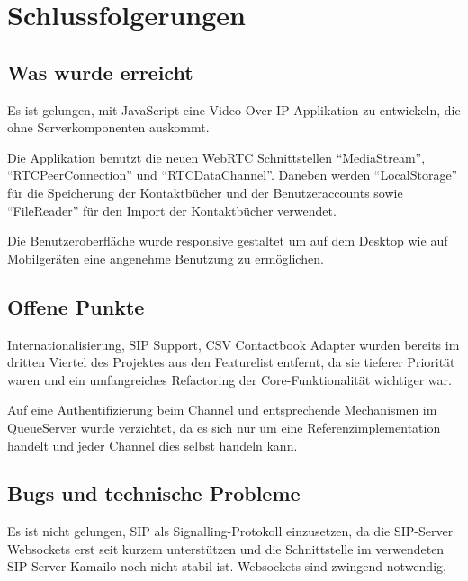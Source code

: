 \chapter{Schlussfolgerungen}
	\section{Was wurde erreicht}
	Es ist gelungen, mit JavaScript eine Video-Over-IP Applikation zu entwickeln, die ohne Serverkomponenten auskommt.
	
	Die Applikation benutzt die neuen WebRTC Schnittstellen ``MediaStream'', ``RTCPeerConnection'' und ``RTCDataChannel''. Daneben werden ``LocalStorage'' für die Speicherung der Kontaktbücher und der Benutzeraccounts sowie ``FileReader'' für den Import der Kontaktbücher verwendet.
	
	Die Benutzeroberfläche wurde responsive gestaltet um auf dem Desktop wie auf Mobilgeräten eine angenehme Benutzung zu ermöglichen.
	
	
	\section{Offene Punkte}
	Internationalisierung, SIP Support, CSV Contactbook Adapter wurden bereits im dritten Viertel des Projektes aus den Featurelist entfernt, da sie tieferer Priorität waren und ein umfangreiches Refactoring der Core-Funktionalität wichtiger war.
	
	Auf eine Authentifizierung beim Channel und entsprechende Mechanismen im QueueServer wurde verzichtet, da es sich nur um eine Referenzimplementation handelt und jeder Channel dies selbst handeln kann.
	
	
	\section{Bugs und technische Probleme}
	Es ist nicht gelungen, SIP als Signalling-Protokoll einzusetzen, da die SIP-Server Websockets erst seit kurzem unterstützen und die Schnittstelle im verwendeten SIP-Server Kamailo noch nicht stabil ist. Websockets sind zwingend notwendig, 
